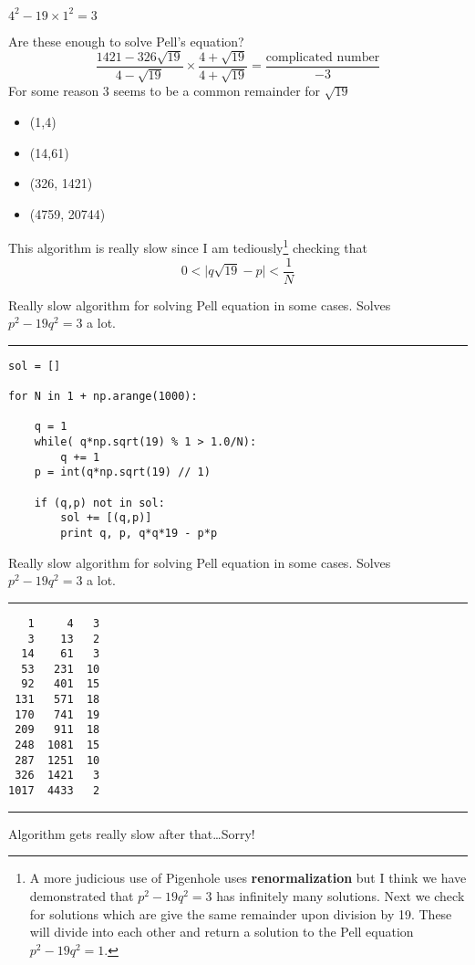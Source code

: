 \documentclass[12pt]{article}
\begin{document}
\noindent $ 4^2 - 19 \times 1^2 = 3$ \newline

\noindent Are these enough to solve Pell's equation?
$$ \frac{1421 - 326\sqrt{19}}{4 - \sqrt{19}}\times \frac{4 + \sqrt{19}}{4 + \sqrt{19}}
= \frac{\text{complicated number}}{-3} $$
For some reason $3$ seems to be a common remainder for $\sqrt{19}$
\begin{itemize}
\item (1,4)
\item (14,61)
\item (326, 1421)
\item (4759, 20744)
\end{itemize}
This algorithm is really slow since I am tediously\footnote{A more judicious use of Pigenhole uses \textbf{renormalization} but I think we have demonstrated that $p^2 - 19q^2 = 3 $ has infinitely many solutions.  Next we check for solutions which are give the same remainder upon division by 19.  These will divide into each other and return a solution to the Pell equation $p^2 - 19q^2 = 1$.} checking that
$$ 0< \big| q \sqrt{19} - p \big| < \frac{1}{N} $$

\newpage

\noindent Really slow algorithm for solving Pell equation in some cases.  Solves $p^2 - 19q^2 = 3$ a lot.
\vspace{6pt}
\hrule

\begin{verbatim}
sol = []

for N in 1 + np.arange(1000):

    q = 1
    while( q*np.sqrt(19) % 1 > 1.0/N):
        q += 1
    p = int(q*np.sqrt(19) // 1)
    
    if (q,p) not in sol:
        sol += [(q,p)]
        print q, p, q*q*19 - p*p
\end{verbatim}

\newpage

\noindent Really slow algorithm for solving Pell equation in some cases.  Solves $p^2 - 19q^2 = 3$ a lot.
\vspace{6pt}
\hrule

\begin{verbatim}
   1     4   3
   3    13   2
  14    61   3
  53   231  10
  92   401  15
 131   571  18
 170   741  19
 209   911  18
 248  1081  15
 287  1251  10
 326  1421   3
1017  4433   2
\end{verbatim}
\vspace{6pt}
\hrule
Algorithm gets really slow after that\dots Sorry!
\end{document}
